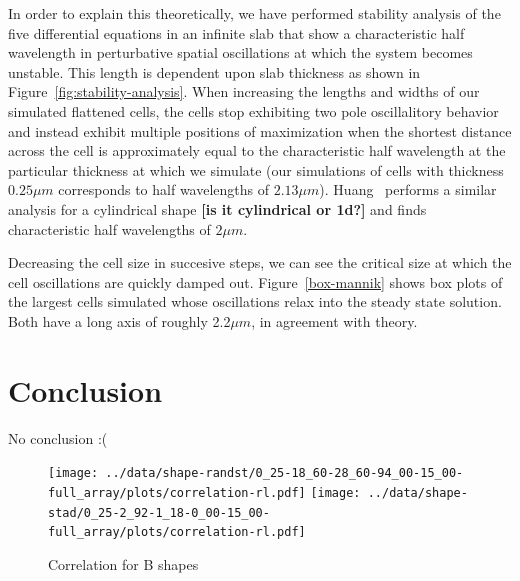 \documentclass[letterpaper,twocolumn,amsmath,amssymb,pre]{revtex4-1}
\newcommand{\red}[1]{{\bf \color{red} #1}}
\newcommand{\fixme}[1]{\red{[#1]}}
\begin{document}
In order to explain this theoretically, we have performed stability
analysis of the five differential equations in an infinite slab that
show a characteristic half wavelength in perturbative spatial
oscillations at which the system becomes unstable.  This length is
dependent upon slab thickness as shown in
Figure~\ref{fig:stability-analysis}.  When increasing the lengths and
widths of our simulated flattened cells, the cells stop exhibiting two
pole oscillalitory behavior and instead exhibit multiple positions of
maximization when the shortest distance across the cell is
approximately equal to the characteristic half wavelength at the
particular thickness at which we simulate (our simulations of cells
with thickness $0.25\mu m$ corresponds to half wavelengths of $2.13\mu
m$).  Huang~\cite{huang2003dynamic} performs a similar analysis for a
cylindrical shape \fixme{is it cylindrical or 1d?} and finds
characteristic half wavelengths of $2\mu m$.


Decreasing the cell size in succesive steps, we can see the critical
size at which the cell oscillations are quickly damped out.
Figure~\ref{box-mannik} shows box plots of the largest cells simulated
whose oscillations relax into the steady state solution.  Both have a
long axis of roughly 2.2$\mu m$, in agreement with theory.

\section{Conclusion}
No conclusion :(
\begin{figure}
  \texttt{[image: ../data/shape-randst/0\_25-18\_60-28\_60-94\_00-15\_00-full\_array/plots/correlation-rl.pdf]}
  \texttt{[image: ../data/shape-stad/0\_25-2\_92-1\_18-0\_00-15\_00-full\_array/plots/correlation-rl.pdf]}
  \caption{Correlation for B shapes}
  \label{corr-B}
\end{figure}


\end{document}
